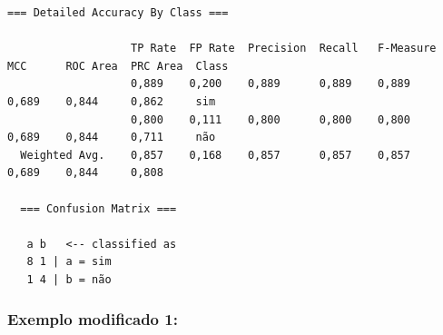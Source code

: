 \documentclass[
    article,            %
    11pt,               %
    oneside,            %
    a4paper,            %
    english,            %
    brazil,             %
    sumario=tradicional,
    ]{abntex2}
\begin{document}
\begin{itemize}
\begin{Verbatim}[frame=single, fontsize=\tiny]
  === Detailed Accuracy By Class ===

                   TP Rate  FP Rate  Precision  Recall   F-Measure  MCC      ROC Area  PRC Area  Class
                   0,889    0,200    0,889      0,889    0,889      0,689    0,844     0,862     sim
                   0,800    0,111    0,800      0,800    0,800      0,689    0,844     0,711     não
  Weighted Avg.    0,857    0,168    0,857      0,857    0,857      0,689    0,844     0,808     

  === Confusion Matrix ===

   a b   <-- classified as
   8 1 | a = sim
   1 4 | b = não
   \end{Verbatim}
\end{itemize}


\subsubsection{\textbf{Exemplo modificado 1:}}
\end{document}
